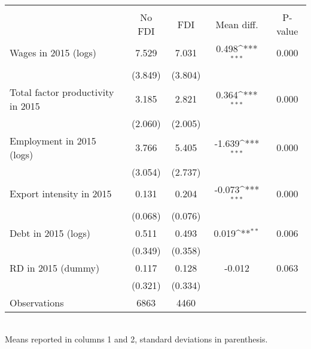 {
\def\sym#1{\ifmmode^{#1}\else\(^{#1}\)\fi}
\begin{tabular}{l*{1}{cccc}}
\hline\hline
                    &\multicolumn{4}{c}{}                                        \\
                    &No FDI&FDI&  Mean diff.         &     P-value\\
\hline
Wages in 2015 (logs)&       7.529&       7.031&       0.498\sym{***}&       0.000\\
                    &     (3.849)&     (3.804)&                     &            \\
Total factor productivity in 2015&       3.185&       2.821&       0.364\sym{***}&       0.000\\
                    &     (2.060)&     (2.005)&                     &            \\
Employment in 2015 (logs)&       3.766&       5.405&      -1.639\sym{***}&       0.000\\
                    &     (3.054)&     (2.737)&                     &            \\
Export intensity in 2015&       0.131&       0.204&      -0.073\sym{***}&       0.000\\
                    &     (0.068)&     (0.076)&                     &            \\
Debt in 2015 (logs) &       0.511&       0.493&       0.019\sym{**} &       0.006\\
                    &     (0.349)&     (0.358)&                     &            \\
RD in 2015 (dummy)  &       0.117&       0.128&      -0.012         &       0.063\\
                    &     (0.321)&     (0.334)&                     &            \\
\hline
Observations        &       6863 &      4460      &                     &            \\
\hline\hline
\end{tabular} \\
\small Means reported in columns 1 and 2, standard deviations in parenthesis.
}
